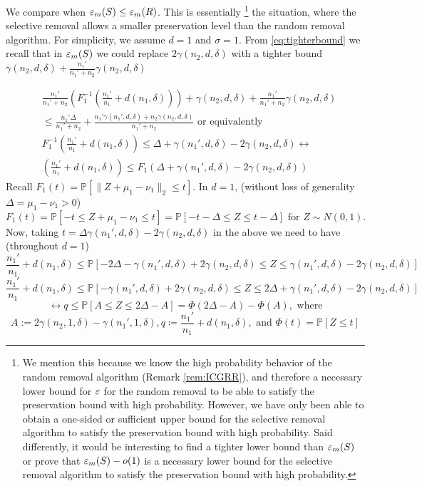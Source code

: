 \begin{remark} \label{rem:CSROGH}
We compare when $\varepsilon_m(S)\leq \varepsilon_m(R)$. This is essentially \footnote{We mention this because we know the high probability behavior of the random removal algorithm (Remark \ref{rem:ICGRR}), and therefore a necessary lower bound for $\varepsilon$ for the random removal to be able to satisfy the preservation bound with high probability. However, we have only been able to obtain a one-sided or sufficient upper bound for the selective removal algorithm to satisfy the preservation bound with high probability. Said differently, it would be interesting to find a tighter lower bound than $\varepsilon_m(S)$ or prove that $\varepsilon_m(S)- o(1)$ is a necessary lower bound for the selective removal algorithm to satisfy the preservation bound with high probability.} the situation, where the selective removal allows a smaller preservation level than the random removal algorithm. For simplicity, we assume $d=1$ and $\sigma=1$. From \eqref{eq:tighterbound} we recall that in $\varepsilon_m(S)$  we could replace $2 \gamma(n_2,d,\delta)$ with a tighter bound $ \gamma(n_2,d,\delta) + \frac{n_1'}{n_1'+n_2} \gamma(n_2,d,\delta)$

\begin{align}
&
\frac{n_1'}{n_1'+n_2}\left(F_1^{-1}\left(\frac{n_1'}{n_1} +d(n_1, \delta)\right)\right)
    + 
 \gamma(n_2,d,\delta) + \frac{n_1'}{n_1'+n_2} \gamma(n_2,d,\delta)
\\
& 
\leq 
\frac{n_1'  \Delta }{n_1' + n_2} + \frac{n_1' \gamma(n_1',d,\delta) + n_2 \gamma(n_2, d,\delta) }{n_1' + n_2} \text{ or equivalently}
\\
&
F_1^{-1}\left(\frac{n_1'}{n_1} +d(n_1, \delta)\right)
\leq \Delta + \gamma(n_1',d,\delta) - 2\gamma(n_2,d,\delta)  \leftrightarrow
\\
&
\left(\frac{n_1'}{n_1} +d(n_1, \delta)\right) \leq F_1(\Delta + \gamma(n_1',d,\delta) - 2\gamma(n_2,d,\delta))
\end{align}
Recall $F_1(t)= \mathbb{P}[\|Z + \mu_1 - \nu_1\|_2 \leq t]$. In $d=1$, (without loss of generality $\Delta= \mu_1-\nu_1>0$) 
\[
F_1(t)
= 
\mathbb{P}[-t\leq Z + \mu_1 - \nu_1 \leq t]
= 
\mathbb{P}[-t -\Delta \leq Z \leq t -\Delta] \text{ for } Z \sim N(0,1).
\]
Now, taking $t= \Delta \gamma(n_1',d,\delta) - 2\gamma(n_2,d,\delta)$ in the above we need to have (throughout $d=1$) 
\[
\frac{n_1'}{n_1} +d(n_1, \delta)
\leq 
\mathbb{P}[-2\Delta - \gamma(n_1',d,\delta) + 2\gamma(n_2,d,\delta) \leq Z \leq  \gamma(n_1',d,\delta) - 2\gamma(n_2,d,\delta)]
\]
\[
\frac{n_1'}{n_1} +d(n_1, \delta)
\leq 
\mathbb{P}[- \gamma(n_1',d,\delta) + 2\gamma(n_2,d,\delta)  \leq Z \leq   2\Delta + \gamma(n_1',d,\delta) - 2\gamma(n_2,d,\delta) ]
\]
\begin{equation} \label{eq:SCSR}
\leftrightarrow q \leq \mathbb{P}[A \leq Z \leq 2\Delta -A] = \Phi(2\Delta -A) - \Phi(A), \text{ where}
\end{equation}
\[
A :=  2 \gamma(n_2,1,\delta)-\gamma(n_1',1,\delta),
q
\coloneqq
\frac{n_1'}{n_1}+d(n_1,\delta),
\text{ and }
\Phi(t)=\mathbb{P}[Z \leq t]
\]



\end{remark}
